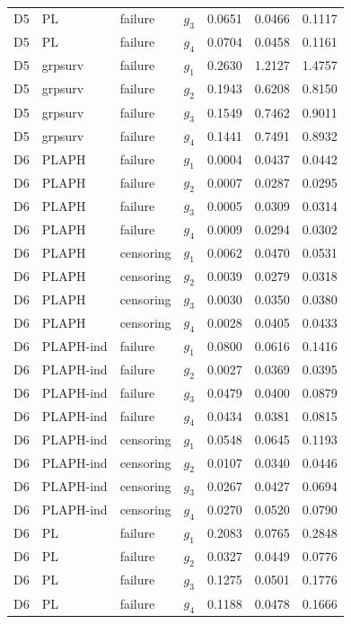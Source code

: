 \begin{longtable}{clllrrr}
D5 & PL & failure & $g_{3}$ & 0.0651 & 0.0466 & 0.1117 \\
D5 & PL & failure & $g_{4}$ & 0.0704 & 0.0458 & 0.1161 \\
D5 & grpsurv & failure & $g_{1}$ & 0.2630 & 1.2127 & 1.4757 \\
D5 & grpsurv & failure & $g_{2}$ & 0.1943 & 0.6208 & 0.8150 \\
D5 & grpsurv & failure & $g_{3}$ & 0.1549 & 0.7462 & 0.9011 \\
D5 & grpsurv & failure & $g_{4}$ & 0.1441 & 0.7491 & 0.8932 \\
D6 & PLAPH & failure & $g_{1}$ & 0.0004 & 0.0437 & 0.0442 \\
D6 & PLAPH & failure & $g_{2}$ & 0.0007 & 0.0287 & 0.0295 \\
D6 & PLAPH & failure & $g_{3}$ & 0.0005 & 0.0309 & 0.0314 \\
D6 & PLAPH & failure & $g_{4}$ & 0.0009 & 0.0294 & 0.0302 \\
D6 & PLAPH & censoring & $g_{1}$ & 0.0062 & 0.0470 & 0.0531 \\
D6 & PLAPH & censoring & $g_{2}$ & 0.0039 & 0.0279 & 0.0318 \\
D6 & PLAPH & censoring & $g_{3}$ & 0.0030 & 0.0350 & 0.0380 \\
D6 & PLAPH & censoring & $g_{4}$ & 0.0028 & 0.0405 & 0.0433 \\
D6 & PLAPH-ind & failure & $g_{1}$ & 0.0800 & 0.0616 & 0.1416 \\
D6 & PLAPH-ind & failure & $g_{2}$ & 0.0027 & 0.0369 & 0.0395 \\
D6 & PLAPH-ind & failure & $g_{3}$ & 0.0479 & 0.0400 & 0.0879 \\
D6 & PLAPH-ind & failure & $g_{4}$ & 0.0434 & 0.0381 & 0.0815 \\
D6 & PLAPH-ind & censoring & $g_{1}$ & 0.0548 & 0.0645 & 0.1193 \\
D6 & PLAPH-ind & censoring & $g_{2}$ & 0.0107 & 0.0340 & 0.0446 \\
D6 & PLAPH-ind & censoring & $g_{3}$ & 0.0267 & 0.0427 & 0.0694 \\
D6 & PLAPH-ind & censoring & $g_{4}$ & 0.0270 & 0.0520 & 0.0790 \\
D6 & PL & failure & $g_{1}$ & 0.2083 & 0.0765 & 0.2848 \\
D6 & PL & failure & $g_{2}$ & 0.0327 & 0.0449 & 0.0776 \\
D6 & PL & failure & $g_{3}$ & 0.1275 & 0.0501 & 0.1776 \\
D6 & PL & failure & $g_{4}$ & 0.1188 & 0.0478 & 0.1666 \\

\end{longtable}
